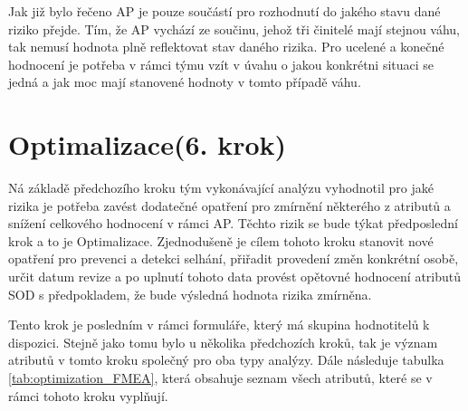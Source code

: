 \begin{enumerate}
Jak již bylo řečeno AP je pouze součástí pro rozhodnutí do jakého stavu dané riziko přejde. Tím, že AP vychází ze součinu, jehož tři činitelé mají stejnou váhu, tak nemusí hodnota plně reflektovat stav daného rizika. Pro ucelené a konečné hodnocení je potřeba v rámci týmu vzít v úvahu o jakou konkrétni situaci se jedná a jak moc mají stanovené hodnoty v tomto případě váhu. 
 
\end{enumerate} 
\section{Optimalizace(6. krok)}
\label{sec:FMEA_postup_6}
Ná základě předchozího kroku tým vykonávající analýzu vyhodnotil pro jaké rizika je potřeba zavést dodatečné opatření pro zmírnění některého z atributů a snížení celkového hodnocení v rámci AP. Těchto rizik se bude týkat předposlední krok a to je Optimalizace. Zjednodušeně je cílem tohoto kroku stanovit nové opatření pro prevenci a detekci selhání, přiřadit provedení změn konkrétní osobě, určit datum revize a po uplnutí tohoto data provést opětovné hodnocení atributů SOD s předpokladem, že bude výsledná hodnota rizika zmírněna.

Tento krok je posledním v rámci formuláře, který má skupina hodnotitelů k dispozici. Stejně jako tomu bylo u několika předchozích kroků, tak je význam atributů v tomto kroku společný pro oba typy analýzy. Dále následuje tabulka \ref{tab:optimization_FMEA}, která obsahuje seznam všech atributů, které se v rámci tohoto kroku vyplňují.

